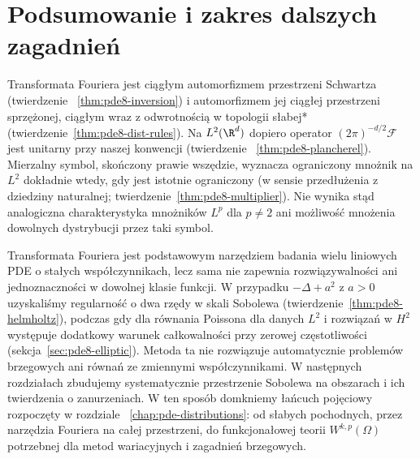 \section{Podsumowanie i zakres dalszych zagadnień}
Transformata Fouriera jest ciągłym automorfizmem
przestrzeni Schwartza (twierdzenie
~\ref{thm:pde8-inversion}) i automorfizmem
jej ciągłej przestrzeni sprzężonej, ciągłym
wraz z odwrotnością w topologii słabej*
(twierdzenie~\ref{thm:pde8-dist-rules}).
Na $L^2(\R^d)$ dopiero operator
$(2\pi)^{-d/2}\mathcal F$ jest unitarny
przy naszej konwencji (twierdzenie
~\ref{thm:pde8-plancherel}).
Mierzalny symbol, skończony prawie wszędzie,
wyznacza ograniczony mnożnik na $L^2$
dokładnie wtedy, gdy jest istotnie ograniczony
(w sensie przedłużenia z dziedziny naturalnej;
twierdzenie~\ref{thm:pde8-multiplier}).
Nie wynika stąd
analogiczna charakterystyka mnożników $L^p$
dla $p\ne2$ ani możliwość mnożenia
dowolnych dystrybucji przez taki symbol.

Transformata Fouriera jest podstawowym narzędziem
badania wielu liniowych PDE o stałych
współczynnikach, lecz sama nie zapewnia
rozwiązywalności ani jednoznaczności
w dowolnej klasie funkcji. W przypadku
$-\Delta+a^2$ z $a>0$ uzyskaliśmy
regularność o dwa rzędy w skali Sobolewa
(twierdzenie~\ref{thm:pde8-helmholtz}),
podczas gdy dla równania Poissona
dla danych $L^2$ i rozwiązań w $H^2$
występuje dodatkowy warunek całkowalności
przy zerowej częstotliwości
(sekcja~\ref{sec:pde8-elliptic}).
Metoda ta nie rozwiązuje automatycznie
problemów brzegowych ani równań
ze zmiennymi współczynnikami.
W następnych rozdziałach zbudujemy
systematycznie przestrzenie Sobolewa
na obszarach i ich twierdzenia o zanurzeniach.
W ten sposób domkniemy łańcuch pojęciowy
rozpoczęty w rozdziale
~\ref{chap:pde-distributions}: od słabych
pochodnych, przez narzędzia Fouriera
na całej przestrzeni, do funkcjonałowej
teorii $W^{k,p}(\Omega)$ potrzebnej
dla metod wariacyjnych i zagadnień brzegowych.
